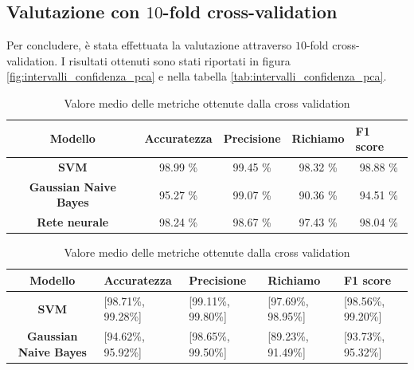 \subsection*{Valutazione con $10$-fold cross-validation}
Per concludere, è stata effettuata la valutazione attraverso $10$-fold
cross-validation. I risultati ottenuti sono stati riportati in figura
\ref{fig:intervalli_confidenza_pca} e nella tabella \ref{tab:intervalli_confidenza_pca}.
\begin{table}[!ht]
    \begin{subtable}[h]{1\textwidth}
        \centering
        \begin{tabular}{@{}cllll@{}}
            \toprule
            \rowcolor[HTML]{EFEFEF}
            \textbf{Modello}                                      & \textbf{Accuratezza}         & \textbf{Precisione}          & \textbf{Richiamo}            & \textbf{F1 score}            \\ \midrule
            \cellcolor[HTML]{EFEFEF}\textbf{SVM}                  & \multicolumn{1}{c}{98.99 \%} & \multicolumn{1}{c}{99.45 \%} & \multicolumn{1}{c}{98.32 \%} & \multicolumn{1}{c}{98.88 \%} \\
            \cellcolor[HTML]{EFEFEF}\textbf{Gaussian Naive Bayes} & \multicolumn{1}{c}{95.27 \%} & \multicolumn{1}{c}{99.07 \%} & \multicolumn{1}{c}{90.36 \%} & \multicolumn{1}{c}{94.51 \%} \\
            \cellcolor[HTML]{EFEFEF}\textbf{Rete neurale}         & \multicolumn{1}{c}{98.24 \%} & \multicolumn{1}{c}{98.67 \%} & \multicolumn{1}{c}{97.43 \%} & \multicolumn{1}{c}{98.04 \%} \\ \bottomrule
        \end{tabular}
        \caption{Valore medio delle metriche ottenute dalla cross validation}
        \label{tab:risultati_cross_val_pca}
    \end{subtable}
    \hfill
    \begin{subtable}[h]{1\textwidth}
        \centering
        \begin{tabular}{@{}cllll@{}}
            \toprule
            \rowcolor[HTML]{EFEFEF}
            \textbf{Modello}                                      & \textbf{Accuratezza} & \textbf{Precisione} & \textbf{Richiamo}  & \textbf{F1 score}  \\ \midrule
            \cellcolor[HTML]{EFEFEF}\textbf{SVM}                  & [98.71\%, 99.28\%]   & [99.11\%, 99.80\%]  & [97.69\%, 98.95\%] & [98.56\%, 99.20\%] \\
            \cellcolor[HTML]{EFEFEF}\textbf{Gaussian Naive Bayes} & [94.62\%, 95.92\%]   & [98.65\%, 99.50\%]  & [89.23\%, 91.49\%] & [93.73\%, 95.32\%] \\

\end{tabular}
\end{subtable}
\end{table}
